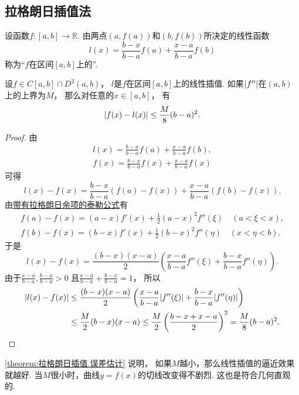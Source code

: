 \subsection{拉格朗日插值法}
\begin{definition}
设函数\(f\colon[a,b]\to\mathbb{R}\).
由两点\((a,f(a))\)和\((b,f(b))\)所决定的线性函数\begin{equation*}
	l(x) = \frac{b-x}{b-a} f(a) + \frac{x-a}{b-a} f(b)
\end{equation*}称为“\(f\)在区间\([a,b]\)上的”.
\end{definition}

\begin{theorem}\label{theorem:拉格朗日插值.误差估计}
设\(f\in C[a,b]\cap D^2(a,b)\)，
\(l\)是\(f\)在区间\([a,b]\)上的线性插值.
如果\(\abs{f''}\)在\((a,b)\)上的上界为\(M\)，
那么对任意的\(x\in[a,b]\)，
有\begin{equation*}
	\abs{f(x)-l(x)}
	\leq \frac{M}8 (b-a)^2.
\end{equation*}
\begin{proof}
由\begin{gather*}
	l(x) = \frac{b-x}{b-a} f(a) + \frac{x-a}{b-a} f(b), \\
	f(x) = \frac{b-x}{b-a} f(x) + \frac{x-a}{b-a} f(x)
\end{gather*}
可得\begin{equation*}
	l(x) - f(x)
	= \frac{b-x}{b-a} (f(a) - f(x))
	+ \frac{x-a}{b-a} (f(b) - f(x)).
\end{equation*}
由\hyperref[equation:微分中值定理.泰勒公式.余项1]{带有拉格朗日余项的泰勒公式}有\begin{gather*}
	f(a) - f(x)
	= (a-x) f'(x) + \frac12 (a-x)^2 f''(\xi)
	\quad(a<\xi<x), \\
	f(b) - f(x)
	= (b-x) f'(x) + \frac12 (b-x)^2 f''(\eta)
	\quad(x<\eta<b).
\end{gather*}
于是\begin{equation*}
	l(x) - f(x)
	= \frac{(b-x)(x-a)}2
	\left(
		\frac{x-a}{b-a} f''(\xi)
		+ \frac{b-x}{b-a} f''(\eta)
	\right).
\end{equation*}
由于\(\frac{x-a}{b-a},\frac{b-x}{b-a}>0\)
且\(\frac{x-a}{b-a}+\frac{b-x}{b-a}=1\)，
所以\begin{align*}
	\abs{l(x) - f(x)}
	&\leq
	\frac{(b-x)(x-a)}2
	\left(
		\frac{x-a}{b-a} \abs{f''(\xi)}
		+ \frac{b-x}{b-a} \abs{f''(\eta)}
	\right) \\
	&\leq
	\frac{M}2 (b-x)(x-a)
	\leq
	\frac{M}2 \left(
		\frac{b-x+x-a}2
	\right)^2
	= \frac{M}8 (b-a)^2.
	\qedhere
\end{align*}
\end{proof}
\end{theorem}
\begin{remark}
\cref{theorem:拉格朗日插值.误差估计} 说明，
如果\(M\)越小，那么线性插值的逼近效果就越好.
当\(M\)很小时，曲线\(y=f(x)\)的切线改变得不剧烈.
这也是符合几何直观的.
\end{remark}

